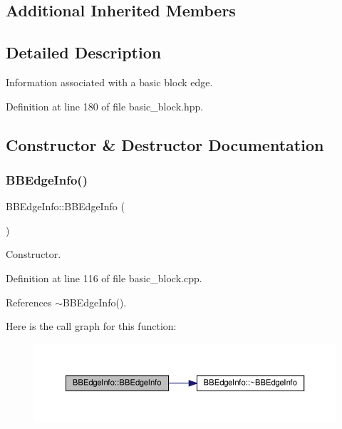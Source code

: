 \subsection*{Additional Inherited Members}


\subsection{Detailed Description}
Information associated with a basic block edge. 

Definition at line 180 of file basic\+\_\+block.\+hpp.



\subsection{Constructor \& Destructor Documentation}
\mbox{\label{structBBEdgeInfo_a61cfdd43ac244182cc6cfb2fa3417928}} 
\subsubsection{\texorpdfstring{B\+B\+Edge\+Info()}{BBEdgeInfo()}}
{\footnotesize\ttfamily B\+B\+Edge\+Info\+::\+B\+B\+Edge\+Info (\begin{DoxyParamCaption}{ }\end{DoxyParamCaption})}



Constructor. 



Definition at line 116 of file basic\+\_\+block.\+cpp.



References $\sim$\+B\+B\+Edge\+Info().

Here is the call graph for this function\+:
\nopagebreak
\begin{figure}[H]
\begin{center}
\leavevmode
\includegraphics[width=350pt]{d7/d8b/structBBEdgeInfo_a61cfdd43ac244182cc6cfb2fa3417928_cgraph}
\end{center}
\end{figure}
\mbox{\label{structBBEdgeInfo_af00fe7eb7e1e14162b3d288dc97e3489}} 
